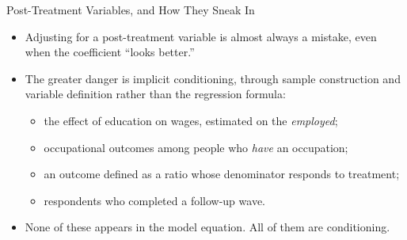 \documentclass[aspectratio=169,11pt,xcolor=dvipsnames]{beamer}
\begin{document}
\begin{frame}{Post-Treatment Variables, and How They Sneak In}
\begin{itemize}\itemsep3pt
  \item Adjusting for a post-treatment variable is almost always a mistake,
        even when the coefficient ``looks better.''
  \item \alert{The greater danger is implicit conditioning}, through sample
        construction and variable definition rather than the regression
        formula:
  \begin{itemize}\itemsep1pt
    \item the effect of education on wages, estimated on the \emph{employed};
    \item occupational outcomes among people who \emph{have} an occupation;
    \item an outcome defined as a ratio whose denominator responds to
          treatment;
    \item respondents who completed a follow-up wave.
  \end{itemize}
  \item None of these appears in the model equation. All of them are
        conditioning.
\end{itemize}
\end{frame}
\end{document}
